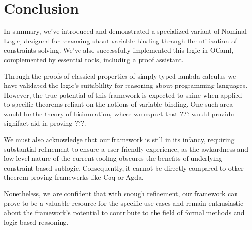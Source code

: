 \documentclass[english, mgr]{iithesis}
\begin{document}
\chapter{Conclusion}

In summary, we've introduced and demonstrated a specialized variant of Nominal Logic,
designed for reasoning about variable binding
through the utilization of constraints solving.
We've also successfully implemented this logic in OCaml,
complemented by essential tools, including a proof assistant.

Through the proofs of classical properties of simply typed lambda calculus
we have validated the logic's suitablility for reasoning about programming languages.
However, the true potential of this framework is expected to shine when applied to
specific theorems reliant on the notions of variable binding.
One such area would be the theory of bisimulation, where we expect that ???
would provide signifact aid in proving ???.

We must also acknowledge that our framework is still in its infancy,
requiring substantial refinement to ensure a user-friendly experience, as the
awkardness and low-level nature of the current tooling obscures the benefits
of underlying constraint-based sublogic.
Consequently, it cannot be directly compared to other theorem-proving frameworks like Coq or Agda.

Nonetheless, we are confident that with enough refinement,
our framework can prove to be a valuable resource for the specific use cases and
remain enthusiastic about the framework's potential to
contribute to the field of formal methods and logic-based reasoning.


\printbibliography
\end{document}
